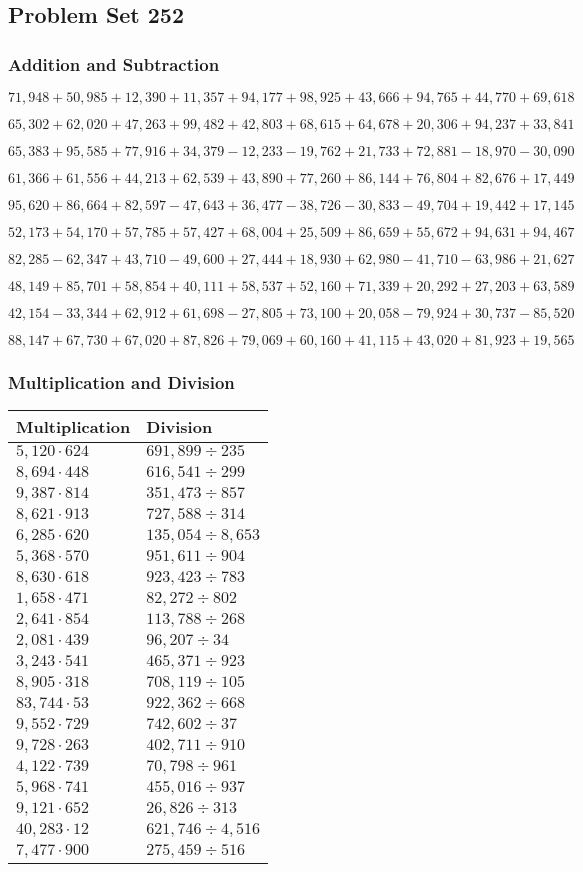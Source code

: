 \hypertarget{problem-set-252}{%
\subsection{Problem Set 252}\label{problem-set-252}}

\hypertarget{addition-and-subtraction}{%
\subsubsection{Addition and
Subtraction}\label{addition-and-subtraction}}

\(71,948+50,985+12,390+11,357+94,177+98,925+43,666+94,765+44,770+69,618\)

\(65,302+62,020+47,263+99,482+42,803+68,615+64,678+20,306+94,237+33,841\)

\(65,383+95,585+77,916+34,379-12,233-19,762+21,733+72,881-18,970-30,090\)

\(61,366+61,556+44,213+62,539+43,890+77,260+86,144+76,804+82,676+17,449\)

\(95,620+86,664+82,597-47,643+36,477-38,726-30,833-49,704+19,442+17,145\)

\(52,173+54,170+57,785+57,427+68,004+25,509+86,659+55,672+94,631+94,467\)

\(82,285-62,347+43,710-49,600+27,444+18,930+62,980-41,710-63,986+21,627\)

\(48,149+85,701+58,854+40,111+58,537+52,160+71,339+20,292+27,203+63,589\)

\(42,154-33,344+62,912+61,698-27,805+73,100+20,058-79,924+30,737-85,520\)

\(88,147+67,730+67,020+87,826+79,069+60,160+41,115+43,020+81,923+19,565\)

\hypertarget{multiplication-and-division}{%
\subsubsection{Multiplication and
Division}\label{multiplication-and-division}}

\begin{longtable}[]{@{}ll@{}}
\toprule
Multiplication & Division\tabularnewline
\midrule
\endhead
\(5,120\cdot624\) & \(691,899÷235\)\tabularnewline
\(8,694\cdot448\) & \(616,541÷299\)\tabularnewline
\(9,387\cdot814\) & \(351,473÷857\)\tabularnewline
\(8,621\cdot913\) & \(727,588÷314\)\tabularnewline
\(6,285\cdot620\) & \(135,054÷8,653\)\tabularnewline
\(5,368\cdot570\) & \(951,611÷904\)\tabularnewline
\(8,630\cdot618\) & \(923,423÷783\)\tabularnewline
\(1,658\cdot471\) & \(82,272÷802\)\tabularnewline
\(2,641\cdot854\) & \(113,788÷268\)\tabularnewline
\(2,081\cdot439\) & \(96,207÷34\)\tabularnewline
\(3,243\cdot541\) & \(465,371÷923\)\tabularnewline
\(8,905\cdot318\) & \(708,119÷105\)\tabularnewline
\(83,744\cdot53\) & \(922,362÷668\)\tabularnewline
\(9,552\cdot729\) & \(742,602÷37\)\tabularnewline
\(9,728\cdot263\) & \(402,711÷910\)\tabularnewline
\(4,122\cdot739\) & \(70,798÷961\)\tabularnewline
\(5,968\cdot741\) & \(455,016÷937\)\tabularnewline
\(9,121\cdot652\) & \(26,826÷313\)\tabularnewline
\(40,283\cdot12\) & \(621,746÷4,516\)\tabularnewline
\(7,477\cdot900\) & \(275,459÷516\)\tabularnewline
\bottomrule
\end{longtable}
